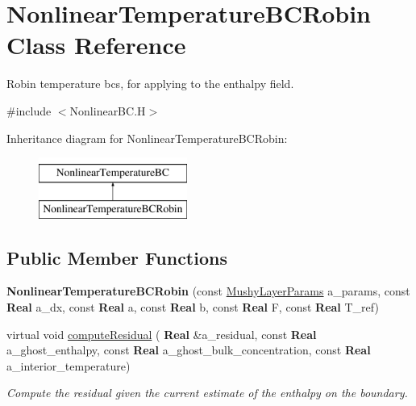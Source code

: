 \hypertarget{class_nonlinear_temperature_b_c_robin}{}\section{Nonlinear\+Temperature\+B\+C\+Robin Class Reference}
\label{class_nonlinear_temperature_b_c_robin}


Robin temperature bcs, for applying to the enthalpy field.  




{\ttfamily \#include $<$Nonlinear\+B\+C.\+H$>$}

Inheritance diagram for Nonlinear\+Temperature\+B\+C\+Robin\+:\begin{figure}[H]
\begin{center}
\leavevmode
\includegraphics[height=2.000000cm]{class_nonlinear_temperature_b_c_robin}
\end{center}
\end{figure}
\subsection*{Public Member Functions}
\begin{DoxyCompactItemize}
\item 
\mbox{\label{class_nonlinear_temperature_b_c_robin_a72c46675e6cf87ad4168bb10ca8fce1a}} 
{\bfseries Nonlinear\+Temperature\+B\+C\+Robin} (const \hyperlink{class_mushy_layer_params}{Mushy\+Layer\+Params} a\+\_\+params, const \textbf{ Real} a\+\_\+dx, const \textbf{ Real} a, const \textbf{ Real} b, const \textbf{ Real} F, const \textbf{ Real} T\+\_\+ref)
\item 
\mbox{\label{class_nonlinear_temperature_b_c_robin_a9c22612ba28cd07329c43ac1a1963b21}} 
virtual void \hyperlink{class_nonlinear_temperature_b_c_robin_a9c22612ba28cd07329c43ac1a1963b21}{compute\+Residual} (\textbf{ Real} \&a\+\_\+residual, const \textbf{ Real} a\+\_\+ghost\+\_\+enthalpy, const \textbf{ Real} a\+\_\+ghost\+\_\+bulk\+\_\+concentration, const \textbf{ Real} a\+\_\+interior\+\_\+temperature)
\begin{DoxyCompactList}\small\item\em Compute the residual given the current estimate of the enthalpy on the boundary. \end{DoxyCompactList}\end{DoxyCompactItemize}
